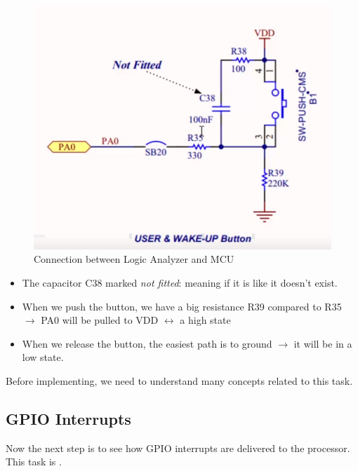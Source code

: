 \begin{figure}[h]
\centering
\includegraphics[scale=0.5]{Figures/driver_part_1/push_button_schematic}
\caption{Connection between Logic Analyzer and MCU}
\label{fig:driver_part_1:push_button_schematic}
\end{figure}

	\begin{itemize}
	
	\item The capacitor C38 marked \textit{not fitted}: meaning if it is like it doesn't exist.
	
	\item When we push the button, we have a big resistance R39 compared to R35 $\rightarrow$ PA0 will be pulled to VDD $\leftrightarrow$ a high state
	
	\item When we release the button, the easiest path is to ground $\rightarrow$ it will be in a low state.
		
	
	\end{itemize}

Before implementing, we need to understand many concepts related to this task.

\subsection{GPIO Interrupts}

Now the next step is to see how GPIO interrupts are delivered to the processor. This task is .

